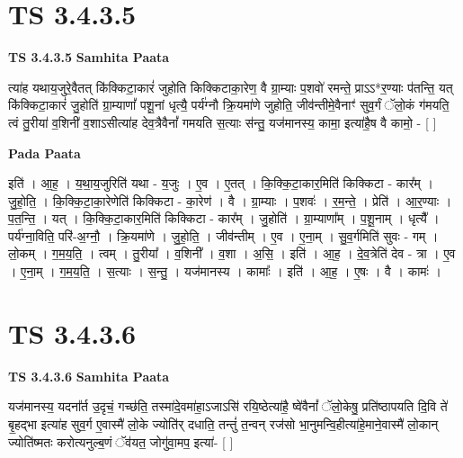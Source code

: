 \documentclass[17pt]{extarticle}
\begin{document}
\section*{ TS 3.4.3.5 }

\textbf{TS 3.4.3.5 } \newline
\textbf{Samhita Paata} \newline

त्या॑ह यथाय॒जुरे॒वैतत् कि॑क्किटा॒कारं॑ जुहोति किक्किटाका॒रेण॒ वै ग्रा॒म्याः प॒शवो॑ रमन्ते॒ प्राऽऽ*र॒ण्याः प॑तन्ति॒ यत् कि॑क्किटा॒कारं॑ जु॒होति॑ ग्रा॒म्याणां᳚ पशू॒नां धृत्यै॒ पर्य॑ग्नौ क्रि॒यमा॑णे जुहोति॒ जीव॑न्तीमे॒वैनाꣳ॑ सुव॒र्गं ॅलो॒कं ग॑मयति॒ त्वं तु॒रीया॑ व॒शिनी॑ व॒शाऽसीत्या॑ह देव॒त्रैवैनां᳚ गमयति स॒त्याः स॑न्तु॒ यज॑मानस्य॒ कामा॒ इत्या॑है॒ष वै कामो॒ -  [  ] \newline

\textbf{Pada Paata} \newline

इति॑ । आ॒ह॒ । य॒था॒य॒जुरिति॑ यथा - य॒जुः । ए॒व । ए॒तत् । कि॒क्कि॒टा॒कार॒मिति॑ किक्किटा - कार᳚म् । जु॒हो॒ति॒ । कि॒क्कि॒टा॒का॒रेणेति॑ किक्किटा - का॒रेण॑ । वै । ग्रा॒म्याः । प॒शवः॑ । र॒म॒न्ते॒ । प्रेति॑ । आ॒र॒ण्याः । प॒त॒न्ति॒ । यत् । कि॒क्कि॒टा॒कार॒मिति॑ किक्किटा - कार᳚म् । जु॒होति॑ । ग्रा॒म्याणा᳚म् । प॒शू॒नाम् । धृत्यै᳚ । पर्य॑ग्ना॒विति॒ परि॑-अ॒ग्नौ॒ । क्रि॒यमा॑णे । जु॒हो॒ति॒ । जीव॑न्तीम् । ए॒व । ए॒ना॒म् । सु॒व॒र्गमिति॑ सुवः - गम् । लो॒कम् । ग॒म॒य॒ति॒ । त्वम् । तु॒रीया᳚ । व॒शिनी᳚ । व॒शा । अ॒सि॒ । इति॑ । आ॒ह॒ । दे॒व॒त्रेति॑ देव - त्रा । ए॒व । ए॒ना॒म् । ग॒म॒य॒ति॒ । स॒त्याः । स॒न्तु॒ । यज॑मानस्य । कामाः᳚ । इति॑ । आ॒ह॒ । ए॒षः । वै । कामः॑ ।  \newline




\section*{ TS 3.4.3.6 }

\textbf{TS 3.4.3.6 } \newline
\textbf{Samhita Paata} \newline

यज॑मानस्य॒ यदना᳚र्त उ॒दृचं॒ गच्छ॑ति॒ तस्मा॑दे॒वमा॑हा॒ऽजाऽसि॑ रयि॒ष्ठेत्या॑है॒ ष्वे॑वैनां᳚ ॅलो॒केषु॒ प्रति॑ष्ठापयति दि॒वि ते॑ बृ॒हद्भा इत्या॑ह सुव॒र्ग ए॒वास्मै॑ लो॒के ज्योति॑र् दधाति॒ तन्तुं॑ त॒न्वन् रज॑सो भा॒नुमन्वि॒हीत्या॑हे॒माने॒वास्मै॑ लो॒कान् ज्योति॑ष्मतः करोत्यनुल्ब॒णं ॅव॑यत॒ जोगु॑वा॒मप॒ इत्या॑-  [  ] \newline
\end{document}
